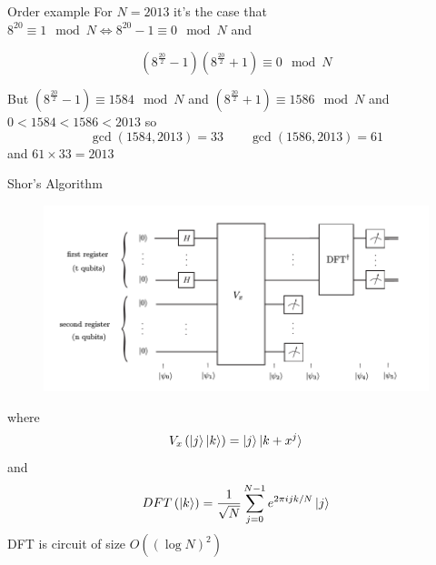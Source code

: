 \documentclass{beamer}
\begin{document}
\begin{frame}{Order example}
For $N=2013$ it's the case that $8^{20}\equiv 1 \mod N \iff 8^{20}- 1 \equiv 0 \mod N$ and 

\[
\left(8^{\frac{20}{2}}-1\right)\left(8^{\frac{20}{2}}+1\right)\equiv 0 \mod N
\]

But $\left(8^{\frac{20}{2}}-1\right)\equiv 1584 \mod N$ and  $\left(8^{\frac{20}{2}}+1\right)\equiv 1586 \mod N$ and $0<1584<1586<2013$ so 
\[
\gcd \left(1584,2013\right)=33 \qquad \gcd \left(1586,2013\right)=61
\]
 and $61\times 33=2013$

\end{frame}

\begin{frame}{Shor's Algorithm}

\begin{figure}[ht]
  \includegraphics[scale=0.4]{pasted5}
\end{figure}
where
{\small 
\[
V_x \left(\ket{j}\ket{k}\right) = \ket{j}\ket{k+x^j}
\]
}
and 
{\small
\[
DFT\left(\ket{k}\right) = \frac{1}{\sqrt{N}}\sum_{j=0}^{N-1}e^{2\pi i j k/N}\ket{j}
\]
}
DFT is circuit of size $O\left(\left(\log N\right)^2\right)$

\end{frame}
\end{document}

